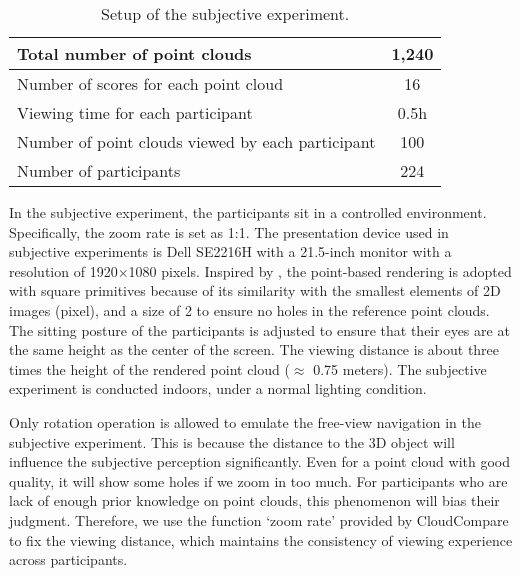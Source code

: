 \documentclass[acmsmall]{acmart}
\begin{document}
\begin{table}[htbp]
  \centering
  \caption{Setup of the subjective experiment.}
  \begin{footnotesize}
    \begin{tabular}{p{13.055em}|c}
    \hline
    Total number of point clouds & 1,240 \\
    \hline
    Number of scores \newline{}for each point cloud & 16 \\
    \hline
    Viewing time \newline{}for each participant & 0.5h \\
    \hline
    Number of point clouds\newline{} viewed by each participant & 100 \\
    \hline
    Number of participants & 224 \\
    \hline
    \end{tabular}\end{footnotesize}
  \label{Configuration}\end{table}


\par In the subjective experiment, the participants sit in a controlled environment. Specifically, the zoom rate is set as 1:1. The presentation device used in subjective experiments is Dell SE2216H with a 21.5-inch monitor with a resolution of 1920$\times$1080 pixels. Inspired by \cite{Javaheri2019IRPC,Yang2020TMM3DTO2D}, the point-based rendering is adopted with square primitives because of its similarity with the smallest elements of 2D images (pixel), and a size of 2 to ensure no holes in the reference point clouds. The sitting posture of the participants is adjusted to ensure that their eyes are at the same height as the center of the screen. The viewing distance is about three times the height of the rendered point cloud ($\approx$ 0.75 meters). The subjective experiment is conducted indoors, under a normal lighting condition.

\par Only rotation operation is allowed to emulate the free-view navigation in the subjective experiment. This is because the distance to the 3D object will influence the subjective perception significantly. Even for a point cloud with good quality, it will show some holes if we zoom in too much. For participants who are lack of enough prior knowledge on point clouds, this phenomenon will bias their judgment. Therefore, we use the function ‘zoom rate’ provided by CloudCompare to fix the viewing distance, which maintains the consistency of viewing experience across participants.
\end{document}
